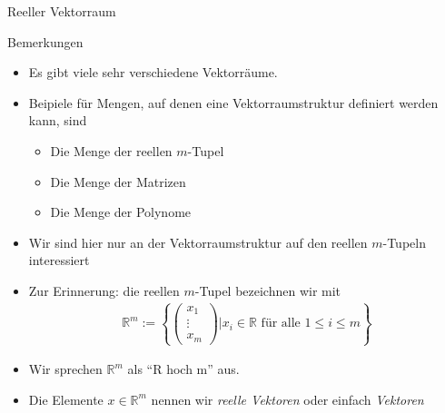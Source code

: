 \documentclass[
  8pt,
  ignorenonframetext,
]{beamer}
\providecommand{\tightlist}{%
  \setlength{\itemsep}{0pt}\setlength{\parskip}{0pt}}
\begin{document}
\begin{frame}{Reeller Vektorraum}
\protect\hypertarget{reeller-vektorraum-1}{}
\vspace{3mm}
\small
\justifying

Bemerkungen

\begin{itemize}
\tightlist
\item
  Es gibt viele sehr verschiedene Vektorräume.
\item
  Beipiele für Mengen, auf denen eine Vektorraumstruktur definiert
  werden kann, sind

  \begin{itemize}
  \tightlist
  \item
    \small Die Menge der reellen \(m\)-Tupel
  \item
    Die Menge der Matrizen
  \item
    Die Menge der Polynome
  \end{itemize}
\item
  Wir sind hier nur an der Vektorraumstruktur auf den reellen
  \(m\)-Tupeln interessiert
\item
  Zur Erinnerung: die reellen \(m\)-Tupel bezeichnen wir mit
  \begin{align*}
  \mathbb{R}^m := 
  \left\{
  \begin{pmatrix}
  x_1 \\ \vdots \\ x_m
  \end{pmatrix}
  \vert x_i \in \mathbb{R} \text{ für alle } 1 \leq i \leq m
  \right\}
  \end{align*}
\item
  Wir sprechen \(\mathbb{R}^m\) als ``R hoch m'' aus.
\item
  Die Elemente \(x \in \mathbb{R}^m\) nennen wir \emph{reelle Vektoren}
  oder einfach \emph{Vektoren}
\end{itemize}
\end{frame}
\end{document}
